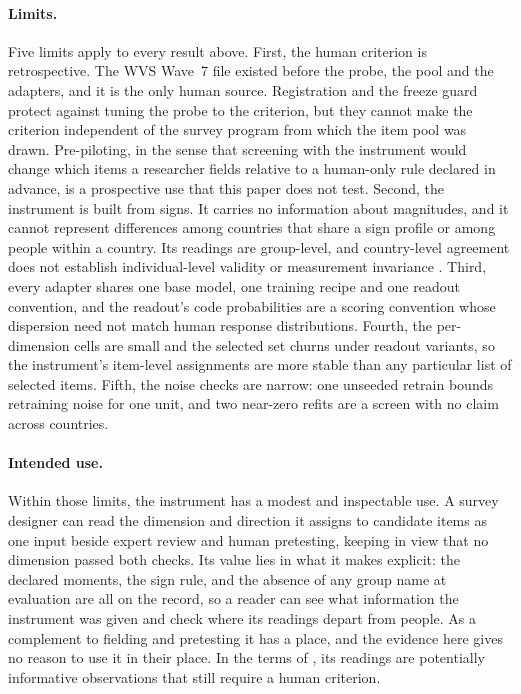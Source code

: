\paragraph{Limits.} Five limits apply to every result above. First, the human criterion is retrospective. The WVS Wave~7 file existed before the probe, the pool and the adapters, and it is the only human source. Registration and the freeze guard protect against tuning the probe to the criterion, but they cannot make the criterion independent of the survey program from which the item pool was drawn. Pre-piloting, in the sense that screening with the instrument would change which items a researcher fields relative to a human-only rule declared in advance, is a prospective use that this paper does not test. Second, the instrument is built from signs. It carries no information about magnitudes, and it cannot represent differences among countries that share a sign profile or among people within a country. Its readings are group-level, and country-level agreement does not establish individual-level validity or measurement invariance \citep{davidov2014,bratt2025}. Third, every adapter shares one base model, one training recipe and one readout convention, and the readout's code probabilities are a scoring convention whose dispersion need not match human response distributions. Fourth, the per-dimension cells are small and the selected set churns under readout variants, so the instrument's item-level assignments are more stable than any particular list of selected items. Fifth, the noise checks are narrow: one unseeded retrain bounds retraining noise for one unit, and two near-zero refits are a screen with no claim across countries.

\paragraph{Intended use.} Within those limits, the instrument has a modest and inspectable use. A survey designer can read the dimension and direction it assigns to candidate items as one input beside expert review and human pretesting, keeping in view that no dimension passed both checks. Its value lies in what it makes explicit: the declared moments, the sign rule, and the absence of any group name at evaluation are all on the record, so a reader can see what information the instrument was given and check where its readings depart from people. As a complement to fielding and pretesting it has a place, and the evidence here gives no reason to use it in their place. In the terms of \citet{broska2025}, its readings are potentially informative observations that still require a human criterion.
